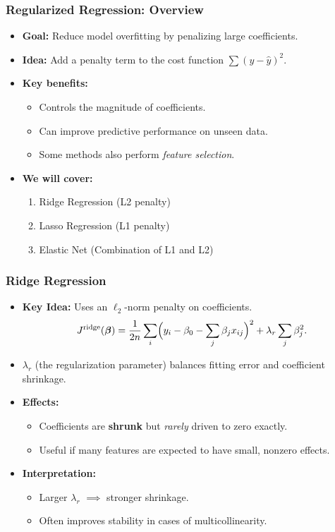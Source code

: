 \documentclass[aspectratio=169]{beamer}
\begin{document}
\begin{frame}
    \frametitle{Regularized Regression: Overview}
    \begin{itemize}
        \item \textbf{Goal:} Reduce model overfitting by penalizing large coefficients.
        \item \textbf{Idea:} Add a penalty term to the cost function \(\sum (y - \hat{y})^2\).
        \item \textbf{Key benefits:}
        \begin{itemize}
            \item Controls the magnitude of coefficients.
            \item Can improve predictive performance on unseen data.
            \item Some methods also perform \emph{feature selection}.
        \end{itemize}
        \item \textbf{We will cover:}
        \begin{enumerate}
            \item Ridge Regression (L2 penalty)
            \item Lasso Regression (L1 penalty)
            \item Elastic Net (Combination of L1 and L2)
        \end{enumerate}
    \end{itemize}
\end{frame}

\begin{frame}
    \frametitle{Ridge Regression}
    \begin{itemize}
        \item \textbf{Key Idea:} Uses an \(\ell_2\)-norm penalty on coefficients.
        \[
            J^{\text{ridge}}(\boldsymbol{\beta}) 
            = \frac{1}{2n}\sum_{i}\Bigl(y_i - \beta_0 - \sum_{j}\beta_j x_{ij}\Bigr)^2 
            + \lambda_r \sum_{j}\beta_j^2.
        \]
        \item \(\lambda_r\) (the regularization parameter) balances fitting error and coefficient shrinkage.
        \item \textbf{Effects:}
        \begin{itemize}
            \item Coefficients are \textbf{shrunk} but \emph{rarely} driven to zero exactly.
            \item Useful if many features are expected to have small, nonzero effects.
        \end{itemize}
        \item \textbf{Interpretation:} 
        \begin{itemize}
            \item Larger \(\lambda_r\) \(\implies\) stronger shrinkage.
            \item Often improves stability in cases of multicollinearity.
        \end{itemize}
    \end{itemize}
\end{frame}
\end{document}
